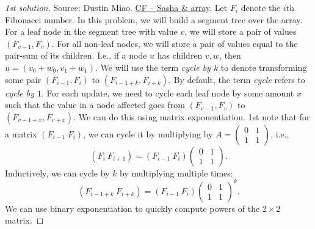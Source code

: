 \documentclass{article}
\begin{document}
\begin{proof}[1st solution]
    Source: {\sc Dustin Miao}. \href{https://usaco.guide/problems/cf-sasha-and-array/solution}{CF -- Sasha \& array}. Let $F_i$ denote the $i$th Fibonacci number. In this problem, we will build a segment tree over the array. For a leaf node in the segment tree with value $v$, we will store a pair of values $(F_{v-1},F_v)$. For all non-leaf nodes, we will store a pair of values equal to the pair-sum of its children. I.e., if a node $u$ has children $v,w$, then $u = (v_0 + w_0,v_1 + w_1)$. We will use the term {\it cycle by $k$} to denote transforming some pair $(F_{i-1},F_i)$ to $(F_{i-1+k},F_{i+k})$. By default, the term {\it cycle} refers to {\it cycle by $1$}. For each update, we need to cycle each leaf node by some amount $x$ such that the value in a node affected goes from $(F_{v-1},F_v)$ to $(F_{v-1+x},F_{v+x})$. We can do this using matrix exponentiation. 1st note that for a matrix $(F_{i-1}\ F_i)$, we can cycle it by multiplying by $A = \begin{pmatrix}
        0 & 1\\1 & 1
    \end{pmatrix}$, i.e.,
    \begin{equation*}
        (F_i\ F_{i+1}) = (F_{i-1}\ F_i)\begin{pmatrix}
            0 & 1\\1 & 1
        \end{pmatrix}.
    \end{equation*}
    Inductively, we can cycle by $k$ by multiplying multiple times:
    \begin{equation*}
        (F_{i-1+k}\ F_{i+k}) = (F_{i-1}\ F_i)\begin{pmatrix}
            0 & 1\\1 & 1
        \end{pmatrix}^k.
    \end{equation*}
    We can use binary exponentiation to quickly compute powers of the $2\times2$ matrix.


\end{proof}
\end{document}
